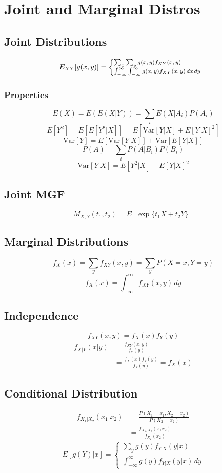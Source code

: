 \section{Joint and Marginal Distros}
	\subsection{Joint Distributions}
		\[ \footnotesize
			E_{XY}[g(x,y)] =
			\begin{cases}
				\sum_{x}\sum_{y} g(x,y) f_{XY}(x,y) \\
				\int_{-\infty}^{\infty}\int_{-\infty}^{\infty} g(x,y) f_{XY}(x,y)\,dx\,dy
			\end{cases}
		\]
		\subsubsection{Properties}
			\[E(X) = E(E(X|Y)) = \sum_{i} E(X|A_i) P(A_i)\]
			{\footnotesize\[ E[Y^2] = E[E[Y^2|X]] = E[\text{Var}[Y|X] + E[Y|X]^2]\]}
			\[ \text{Var}[Y] = E[\text{Var}[Y|X]] + \text{Var}[E[Y|X]] \]
			\[P(A) = \sum_{i} P(A|B_i)P(B_i)\]
			\[\text{Var}[Y|X] = E[Y^2|X] - E[Y|X]^2\]
			
	\subsection{Joint MGF}
		\[M_{X,Y}(t_1,t_2) = E[\exp\{t_1X+t_2Y\}]\]
	
	\subsection{Marginal Distributions}
		\[ f_X(x) = \sum_{y} f_{XY}(x,y) = \sum_{y} P(X=x,Y=y) \]
		\[ f_X(x) = \int_{-\infty}^{\infty} f_{XY}(x,y)\,dy \]
	
	\subsection{Independence}
		\[f_{XY}(x,y) = f_X(x)f_Y(y) \]
		\begin{equation*}
			\begin{split}
				f_{X|Y}(x|y) &= \frac{f_{XY}(x,y)}{f_Y(y)} \\ &= \frac{f_X(x)f_Y(y)}{f_Y(y)} = f_X(x)
			\end{split}
		\end{equation*}
		
	\subsection{Conditional Distribution}
		\begin{equation*}
			\begin{split}
				f_{X_1|X_2}(x_1|x_2) &= \frac{P(X_1=x_1, X_2=x_2)}{P(X_2=x_2)} \\ 
				&= \frac{f_{X_1,X_2} (x_1x_2)}{f_{X_2}(x_2)}
			\end{split}
		\end{equation*}
		\[ E[g(Y)|x] = \begin{cases}
			\sum_{y} g(y) f_{Y|X}(y|x) \\
			\int_{-\infty}^{\infty} g(y)f_{Y|X}(y|x)\,dy
		\end{cases}\]

